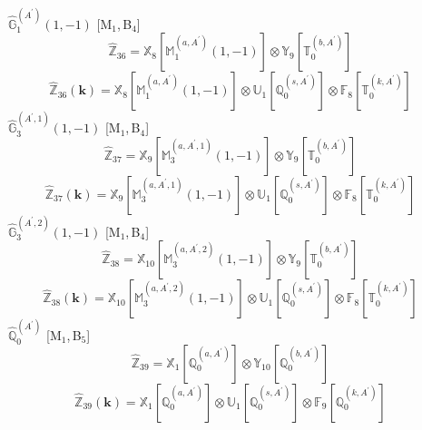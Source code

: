 \documentclass[fleqn,10pt,landscape]{article}
\begin{document}
\begin{itemize}
\noindent {} $\,\,\,\hat{\mathbb{G}}_{1}^{(A^{\prime})}(1,-1)$ [M$_{1}$,\,B$_{4}$]
\begin{dmath*}
\hat{\mathbb{Z}}_{36}=\mathbb{X}_{8}[\mathbb{M}_{1}^{(a,A^{\prime})}(1,-1)] \otimes\mathbb{Y}_{9}[\mathbb{T}_{0}^{(b,A^{\prime})}]
\end{dmath*}
\begin{dmath*}
\hat{\mathbb{Z}}_{36}(\bm{k})=\mathbb{X}_{8}[\mathbb{M}_{1}^{(a,A^{\prime})}(1,-1)] \otimes\mathbb{U}_{1}[\mathbb{Q}_{0}^{(s,A^{\prime})}] \otimes\mathbb{F}_{8}[\mathbb{T}_{0}^{(k,A^{\prime})}]
\end{dmath*}
\vspace{4mm}
\noindent {} $\,\,\,\hat{\mathbb{G}}_{3}^{(A^{\prime},1)}(1,-1)$ [M$_{1}$,\,B$_{4}$]
\begin{dmath*}
\hat{\mathbb{Z}}_{37}=\mathbb{X}_{9}[\mathbb{M}_{3}^{(a,A^{\prime},1)}(1,-1)] \otimes\mathbb{Y}_{9}[\mathbb{T}_{0}^{(b,A^{\prime})}]
\end{dmath*}
\begin{dmath*}
\hat{\mathbb{Z}}_{37}(\bm{k})=\mathbb{X}_{9}[\mathbb{M}_{3}^{(a,A^{\prime},1)}(1,-1)] \otimes\mathbb{U}_{1}[\mathbb{Q}_{0}^{(s,A^{\prime})}] \otimes\mathbb{F}_{8}[\mathbb{T}_{0}^{(k,A^{\prime})}]
\end{dmath*}
\vspace{4mm}
\noindent {} $\,\,\,\hat{\mathbb{G}}_{3}^{(A^{\prime},2)}(1,-1)$ [M$_{1}$,\,B$_{4}$]
\begin{dmath*}
\hat{\mathbb{Z}}_{38}=\mathbb{X}_{10}[\mathbb{M}_{3}^{(a,A^{\prime},2)}(1,-1)] \otimes\mathbb{Y}_{9}[\mathbb{T}_{0}^{(b,A^{\prime})}]
\end{dmath*}
\begin{dmath*}
\hat{\mathbb{Z}}_{38}(\bm{k})=\mathbb{X}_{10}[\mathbb{M}_{3}^{(a,A^{\prime},2)}(1,-1)] \otimes\mathbb{U}_{1}[\mathbb{Q}_{0}^{(s,A^{\prime})}] \otimes\mathbb{F}_{8}[\mathbb{T}_{0}^{(k,A^{\prime})}]
\end{dmath*}
\vspace{4mm}
\noindent {} $\,\,\,\hat{\mathbb{Q}}_{0}^{(A^{\prime})}$ [M$_{1}$,\,B$_{5}$]
\begin{dmath*}
\hat{\mathbb{Z}}_{39}=\mathbb{X}_{1}[\mathbb{Q}_{0}^{(a,A^{\prime})}] \otimes\mathbb{Y}_{10}[\mathbb{Q}_{0}^{(b,A^{\prime})}]
\end{dmath*}
\begin{dmath*}
\hat{\mathbb{Z}}_{39}(\bm{k})=\mathbb{X}_{1}[\mathbb{Q}_{0}^{(a,A^{\prime})}] \otimes\mathbb{U}_{1}[\mathbb{Q}_{0}^{(s,A^{\prime})}] \otimes\mathbb{F}_{9}[\mathbb{Q}_{0}^{(k,A^{\prime})}]

\end{dmath*}
\end{itemize}
\end{document}
